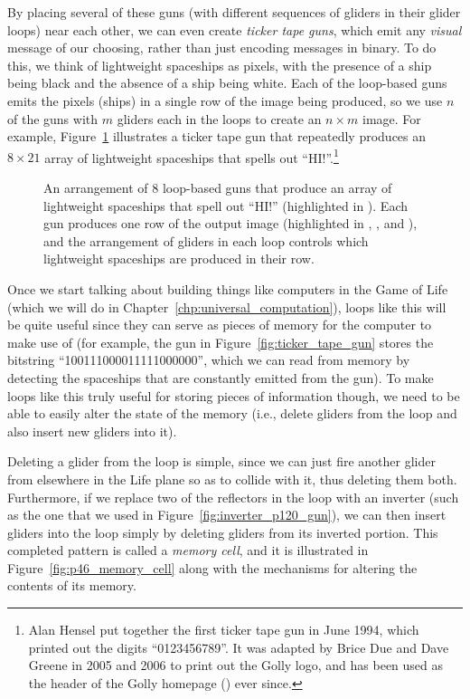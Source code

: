 By placing several of these guns (with different sequences of gliders in their glider loops) near each other, we can even create \emph{ticker tape guns}, which emit any \emph{visual} message of our choosing, rather than just encoding messages in binary. To do this, we think of lightweight spaceships as pixels, with the presence of a ship being black and the absence of a ship being white. Each of the loop-based guns emits the pixels (ships) in a single row of the image being produced, so we use $n$ of the guns with $m$ gliders each in the loops to create an $n \times m$ image. For example, Figure~\ref{fig:ticker_tape_hi_gun} illustrates a ticker tape gun that repeatedly produces an $8 \times 21$ array of lightweight spaceships that spells out ``HI!''.\footnote{Alan Hensel put together the first ticker tape gun in June 1994, which printed out the digits ``0123456789''. It was adapted by Brice Due and Dave Greene in 2005 and 2006 to print out the Golly logo, and has been used as the header of the Golly homepage () ever since.}

\begin{figure}[!htb]
	\centering
	\caption{An arrangement of $8$ loop-based guns that produce an array of lightweight spaceships that spell out ``HI!'' (highlighted in ). Each gun produces one row of the output image (highlighted in , , and ), and the arrangement of gliders in each loop controls which lightweight spaceships are produced in their row.}\label{fig:ticker_tape_hi_gun}
\end{figure}

Once we start talking about building things like computers in the Game of Life (which we will do in Chapter~\ref{chp:universal_computation}), loops like this will be quite useful since they can serve as pieces of memory for the computer to make use of (for example, the gun in Figure~\ref{fig:ticker_tape_gun} stores the bitstring ``100111000011111000000'', which we can read from memory by detecting the spaceships that are constantly emitted from the gun). To make loops like this truly useful for storing pieces of information though, we need to be able to easily alter the state of the memory (i.e., delete gliders from the loop and also insert new gliders into it).

Deleting a glider from the loop is simple, since we can just fire another glider from elsewhere in the Life plane so as to collide with it, thus deleting them both. Furthermore, if we replace two of the reflectors in the loop with an inverter (such as the one that we used in Figure~\ref{fig:inverter_p120_gun}), we can then insert gliders into the loop simply by deleting gliders from its inverted portion. This completed pattern is called a \emph{memory cell}, and it is illustrated in Figure~\ref{fig:p46_memory_cell} along with the mechanisms for altering the contents of its memory.

